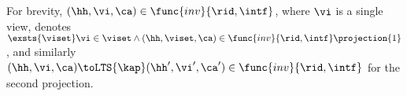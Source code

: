 



For brevity, \( (\hh,\vi,\ca) \in \func{inv}{\rid, \intf} \), where \( \vi \) is a single view, denotes \( \exsts{\viset } \vi \in \viset \land (\hh,\viset,\ca) \in \func{inv}{\rid,\intf}\projection{1} \), and similarly \( (\hh,\vi,\ca) \toLTS{\kap} (\hh',\vi',\ca') \in \func{inv}{\rid, \intf} \) for the second projection.

